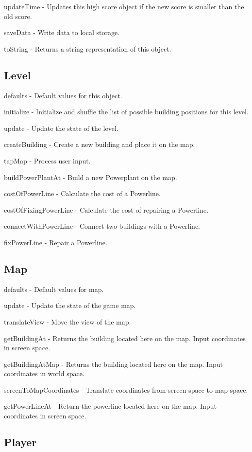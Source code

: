 	updateTime - Updates this high score object if the new score is smaller than the old score.

	saveData - Write data to local storage.

	toString - Returns a string representation of this object.

\subsection*{Level}
	
	defaults - Default values for this object.

	initialize - Initialize and shuffle the list of possible building positions for this level.

	update - Update the state of the level.

	createBuilding - Create a new building and place it on the map.

	tapMap - Process user input.

	buildPowerPlantAt - Build a new Powerplant on the map.

	costOfPowerLine - Calculate the cost of a Powerline.

	costOfFixingPowerLine - Calculate the cost of repairing a Powerline.

	connectWithPowerLine - Connect two buildings with a Powerline.

	fixPowerLine - Repair a Powerline.

\subsection*{Map}

	defaults - Default values for map.

	update - Update the state of the game map.

	translateView - Move the view of the map.

	getBuildingAt - Returns the building located here on the map. Input coordinates in screen space.

	getBuildingAtMap - Returns the building located here on the map. Input coordinates in world space.

	screenToMapCoordinates - Translate coordinates from screen space to map space.

	getPowerLineAt - Return the powerline located here on the map. Input coordinates in screen space.

\subsection*{Player}

